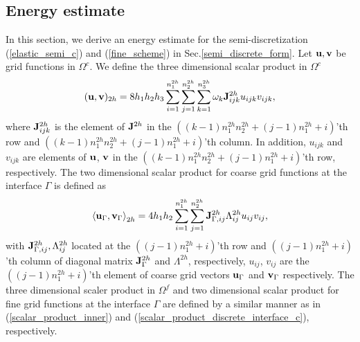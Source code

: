 \subsection{Energy estimate}\label{sec_energy}
In this section, we derive an energy estimate for the semi-discretization (\ref{elastic_semi_c}) and (\ref{fine_scheme}) in Sec.\ref{semi_discrete_form}. Let ${\bf u}, {\bf v}$ be grid functions in $\Omega^c$. We define the three dimensional scalar product in $\Omega^c$
\begin{equation}\label{scalar_product_inner}
({\bf u}, {\bf v})_{2h} = 8h_1h_2h_3\sum_{i=1}^{n_1^{2h}}\sum_{j=1}^{n_2^{2h}}\sum_{k=1}^{n_3^{2h}}\omega_k{\bf J}_{ijk}^{2h}u_{ijk}v_{ijk},
\end{equation}
where ${\bf J}^{2h}_{ijk}$ is the element of ${\bf J}^{2h}$ in the $((k-1)n_1^{2h}n_2^{2h}+(j-1)n_1^{2h}+i)$'th row and $((k-1)n_1^{2h}n_2^{2h}+(j-1)n_1^{2h}+i)$'th column. In addition, $u_{ijk}$ and $v_{ijk}$ are elements of  ${\bf u}$, ${\bf v}$ in the $((k-1)n_1^{2h}n_2^{2h}+(j-1)n_1^{2h}+i)$'th row, respectively. The two dimensional scalar product for coarse grid functions at the interface $\Gamma$ is defined as 
\begin{equation}\label{scalar_product_discrete_interface_c}
\left<{\bf u}_{\Gamma}, {\bf v}_{\Gamma}\right>_{2h} = 4h_1h_2\sum_{i=1}^{n_1^{2h}}\sum_{j=1}^{n_2^{2h}}{\bf  J}_{\Gamma,ij}^{2h}\Lambda^{2h}_{ij}u_{ij}v_{ij},
\end{equation}
with ${\bf J}^{2h}_{\Gamma,ij}, \Lambda^{2h}_{ij}$ located at the $((j-1)n_1^{2h}+i)$'th row and $((j-1)n_1^{2h}+i)$'th column of diagonal matrix ${\bf J}_{\Gamma}^{2h}$ and $\Lambda^{2h}$, respectively, $u_{ij}$, $v_{ij}$ are the $((j-1)n_1^{2h}+i)$'th element of coarse grid vectors ${\bf u}_{\Gamma}$ and ${\bf v}_{\Gamma}$ respectively. The three dimensional scaler product in $\Omega^f$ and two dimensional scalar product for fine grid functions at the interface $\Gamma$ are defined by a similar manner as in (\ref{scalar_product_inner}) and (\ref{scalar_product_discrete_interface_c}), respectively.

